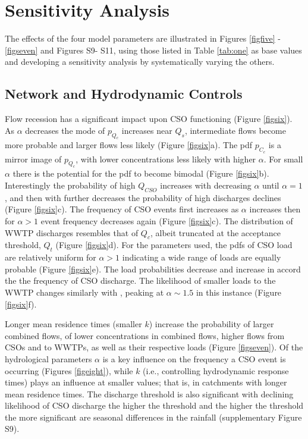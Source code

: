 \documentclass[draft,linenumbers]{agujournal2018}
\begin{document}
 \section{Sensitivity Analysis}
The ef\/fects of the four model parameters are illustrated in Figures \ref{figfive} - \ref{figseven} and Figures S9- S11, using those listed in Table \ref{tab:one} as base values and developing a sensitivity analysis by systematically varying the others.

\subsection{Network and Hydrodynamic Controls}
Flow recession has a signif\/icant impact upon CSO functioning (Figure \ref{figsix}). As $\alpha$ decreases the mode of $p_{Q_c}$ increases near $Q_s$, intermediate f\/lows become more probable and larger f\/lows less likely (Figure \ref{figsix}a). The pdf $p_{C_c}$ is a mirror image of $p_{Q_c}$, with lower concentrations less likely with higher $\alpha$. For small $\alpha$ there is the potential for the pdf to become bimodal (Figure \ref{figsix}b). Interestingly the probability of high $Q_{CSO}$ increases with decreasing $\alpha$ until $\alpha = 1$, and then with further decreases the probability of high discharges declines (Figure \ref{figsix}c). The frequency of CSO events f\/irst increases as $\alpha$ increases then for $\alpha > 1$ event frequency decreases again (Figure \ref{figsix}c). The distribution of WWTP discharges resembles that of $Q_c$, albeit truncated at the acceptance threshold, $Q_t$ (Figure \ref{figsix}d). For the parameters used, the pdfs of CSO load are relatively uniform for $\alpha > 1$ indicating a wide range of loads are equally probable (Figure \ref{figsix}e). The load probabilities decrease and increase in accord the the frequency of CSO discharge. The likelihood of smaller loads to the WWTP changes similarly with , peaking at $\alpha \sim 1.5$ in this instance (Figure \ref{figsix}f). 

Longer mean residence times (smaller $k$) increase the probability of larger combined f\/lows, of lower concentrations in combined f\/lows, higher f\/lows from CSOs and to WWTPs, as well as their respective loads (Figure \ref{figseven}). Of the hydrological parameters $\alpha$ is a key inf\/luence on the frequency a CSO event is occurring (Figures \ref{figeight}), while $k$ (i.e., controlling hydrodynamic response times) plays an inf\/luence at smaller values; that is, in catchments with longer mean residence times. The discharge threshold is also signif\/icant with declining likelihood of CSO discharge the higher the threshold and the higher the threshold the more signif\/icant are seasonal dif\/ferences in the rainfall (supplementary Figure S9).
\end{document}
